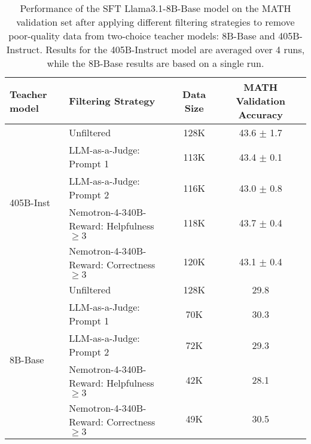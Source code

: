 \begin{table*}[h]
    \centering
    \caption{Performance of the SFT Llama3.1-8B-Base model on the MATH validation set after applying different filtering strategies to remove poor-quality data from two-choice teacher models: 8B-Base and 405B-Instruct. Results for the 405B-Instruct model are averaged over 4 runs, while the 8B-Base results are based on a single run. }
    \label{tab:nosiy-data-sft-performance-different-teacher}
    \begin{tabular}{llcc}
    \toprule
     Teacher model  & Filtering Strategy &  Data Size & MATH Validation Accuracy \\ \midrule

     \multirow{5}{*}{405B-Inst} 
     & Unfiltered    & 128K &  43.6 $\pm$ 1.7 \\
     & LLM-as-a-Judge: Prompt 1  & 113K           &  43.4 $\pm$ 0.1 \\ 
     & LLM-as-a-Judge: Prompt 2  & 116K          &  43.0 $\pm$ 0.8 \\
     & Nemotron-4-340B-Reward: Helpfulness $\ge 3$  & 118K &  43.7 $\pm$ 0.4 \\
     & Nemotron-4-340B-Reward: Correctness $\ge 3$  & 120K &  43.1 $\pm$ 0.4\\
     
     \midrule
     \multirow{5}{*}{8B-Base} 
     & Unfiltered    & 128K & 29.8 \\
     & LLM-as-a-Judge: Prompt 1  & \phantom{1}70K & 30.3   \\ 
     & LLM-as-a-Judge: Prompt 2  & \phantom{1}72K &  29.3 \\
     & Nemotron-4-340B-Reward: Helpfulness $\ge 3$  & \phantom{1}42K &    28.1 \\
     & Nemotron-4-340B-Reward: Correctness $\ge 3$  &  \phantom{1}49K &   30.5 \\
      \bottomrule
    \end{tabular}
\end{table*}
